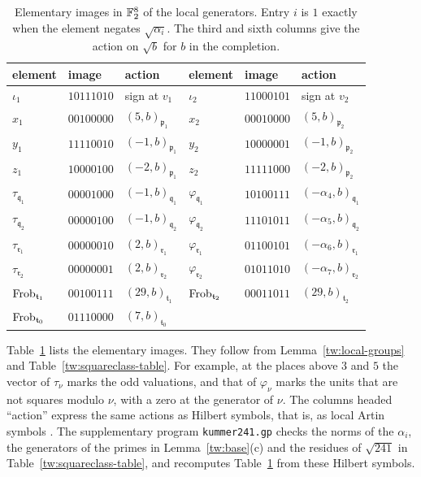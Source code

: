 \begin{table}[htbp]
\centering
\caption{Elementary images in $\mathbb F_2^8$ of the local generators. Entry $i$
is $1$ exactly when the element negates $\sqrt{\alpha_i}$. The third and
sixth columns give the action on $\sqrt b$ for $b$ in the completion.}
\label{tw:vector-table}
\begin{tabular}{lll@{\qquad}lll}
\toprule
element & image & action & element & image & action\\
\midrule
$\iota_1$ & $10111010$ & sign at $v_1$ & $\iota_2$ & $11000101$ & sign at $v_2$\\
$x_1$ & $00100000$ & $(5,b)_{\mathfrak p_1}$ & $x_2$ & $00010000$ & $(5,b)_{\mathfrak p_2}$\\
$y_1$ & $11110010$ & $(-1,b)_{\mathfrak p_1}$ & $y_2$ & $10000001$ & $(-1,b)_{\mathfrak p_2}$\\
$z_1$ & $10000100$ & $(-2,b)_{\mathfrak p_1}$ & $z_2$ & $11111000$ & $(-2,b)_{\mathfrak p_2}$\\
$\tau_{\mathfrak q_1}$ & $00001000$ & $(-1,b)_{\mathfrak q_1}$ & $\varphi_{\mathfrak q_1}$ & $10100111$ & $(-\alpha_4,b)_{\mathfrak q_1}$\\
$\tau_{\mathfrak q_2}$ & $00000100$ & $(-1,b)_{\mathfrak q_2}$ & $\varphi_{\mathfrak q_2}$ & $11101011$ & $(-\alpha_5,b)_{\mathfrak q_2}$\\
$\tau_{\mathfrak r_1}$ & $00000010$ & $(2,b)_{\mathfrak r_1}$ & $\varphi_{\mathfrak r_1}$ & $01100101$ & $(-\alpha_6,b)_{\mathfrak r_1}$\\
$\tau_{\mathfrak r_2}$ & $00000001$ & $(2,b)_{\mathfrak r_2}$ & $\varphi_{\mathfrak r_2}$ & $01011010$ & $(-\alpha_7,b)_{\mathfrak r_2}$\\
$\operatorname{Frob}_{\mathfrak t_1}$ & $00100111$ & $(29,b)_{\mathfrak t_1}$ & $\operatorname{Frob}_{\mathfrak t_2}$ & $00011011$ & $(29,b)_{\mathfrak t_2}$\\
$\operatorname{Frob}_{\mathfrak t_0}$ & $01110000$ & $(7,b)_{\mathfrak t_0}$ & & &\\
\bottomrule
\end{tabular}
\end{table}

Table~\ref{tw:vector-table} lists the elementary images. They follow from
Lemma~\ref{tw:local-groups} and Table~\ref{tw:squareclass-table}. For
example, at the places above $3$ and $5$ the vector of $\tau_\nu$ marks the
odd valuations, and that of $\varphi_\nu$ marks the units that are not
squares modulo $\nu$, with a zero at the generator of $\nu$. The columns
headed ``action'' express the same actions as Hilbert symbols, that is, as
local Artin symbols \cite[Chapter~III, Remark~4.5]{MilneCFT}. The
supplementary program \texttt{kummer241.gp} checks the norms of the
$\alpha_i$, the generators of the primes in Lemma~\ref{tw:base}(c) and the
residues of $\sqrt{241}$ in Table~\ref{tw:squareclass-table}, and recomputes
Table~\ref{tw:vector-table} from these Hilbert symbols.

